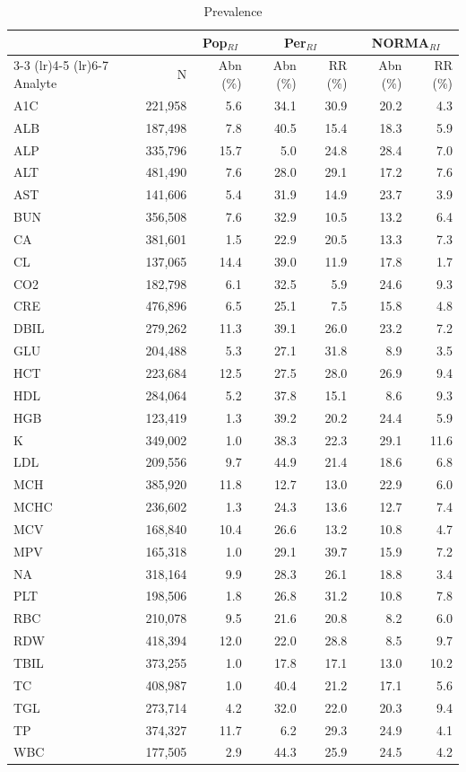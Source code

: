 \begin{table}[ht]
\centering
\footnotesize
\begin{tabular}{lrrrrrr}
\toprule
 & & \multicolumn{1}{c}{Pop$_{RI}$} & \multicolumn{2}{c}{Per$_{RI}$} & \multicolumn{2}{c}{NORMA$_{RI}$} \\
\cmidrule(lr){3-3} \cmidrule(lr){4-5} \cmidrule(lr){6-7}
Analyte & N & Abn (\%) & Abn (\%) & RR (\%) & Abn (\%) & RR (\%) \\
\midrule
A1C & 221,958 & 5.6 & 34.1 & 30.9 & 20.2 & 4.3 \\
ALB & 187,498 & 7.8 & 40.5 & 15.4 & 18.3 & 5.9 \\
ALP & 335,796 & 15.7 & 5.0 & 24.8 & 28.4 & 7.0 \\
ALT & 481,490 & 7.6 & 28.0 & 29.1 & 17.2 & 7.6 \\
AST & 141,606 & 5.4 & 31.9 & 14.9 & 23.7 & 3.9 \\
BUN & 356,508 & 7.6 & 32.9 & 10.5 & 13.2 & 6.4 \\
CA & 381,601 & 1.5 & 22.9 & 20.5 & 13.3 & 7.3 \\
CL & 137,065 & 14.4 & 39.0 & 11.9 & 17.8 & 1.7 \\
CO2 & 182,798 & 6.1 & 32.5 & 5.9 & 24.6 & 9.3 \\
CRE & 476,896 & 6.5 & 25.1 & 7.5 & 15.8 & 4.8 \\
DBIL & 279,262 & 11.3 & 39.1 & 26.0 & 23.2 & 7.2 \\
GLU & 204,488 & 5.3 & 27.1 & 31.8 & 8.9 & 3.5 \\
HCT & 223,684 & 12.5 & 27.5 & 28.0 & 26.9 & 9.4 \\
HDL & 284,064 & 5.2 & 37.8 & 15.1 & 8.6 & 9.3 \\
HGB & 123,419 & 1.3 & 39.2 & 20.2 & 24.4 & 5.9 \\
K & 349,002 & 1.0 & 38.3 & 22.3 & 29.1 & 11.6 \\
LDL & 209,556 & 9.7 & 44.9 & 21.4 & 18.6 & 6.8 \\
MCH & 385,920 & 11.8 & 12.7 & 13.0 & 22.9 & 6.0 \\
MCHC & 236,602 & 1.3 & 24.3 & 13.6 & 12.7 & 7.4 \\
MCV & 168,840 & 10.4 & 26.6 & 13.2 & 10.8 & 4.7 \\
MPV & 165,318 & 1.0 & 29.1 & 39.7 & 15.9 & 7.2 \\
NA & 318,164 & 9.9 & 28.3 & 26.1 & 18.8 & 3.4 \\
PLT & 198,506 & 1.8 & 26.8 & 31.2 & 10.8 & 7.8 \\
RBC & 210,078 & 9.5 & 21.6 & 20.8 & 8.2 & 6.0 \\
RDW & 418,394 & 12.0 & 22.0 & 28.8 & 8.5 & 9.7 \\
TBIL & 373,255 & 1.0 & 17.8 & 17.1 & 13.0 & 10.2 \\
TC & 408,987 & 1.0 & 40.4 & 21.2 & 17.1 & 5.6 \\
TGL & 273,714 & 4.2 & 32.0 & 22.0 & 20.3 & 9.4 \\
TP & 374,327 & 11.7 & 6.2 & 29.3 & 24.9 & 4.1 \\
WBC & 177,505 & 2.9 & 44.3 & 25.9 & 24.5 & 4.2 \\
\bottomrule
\end{tabular}
\caption{Prevalence}
\label{tab:prevalence}
\end{table}